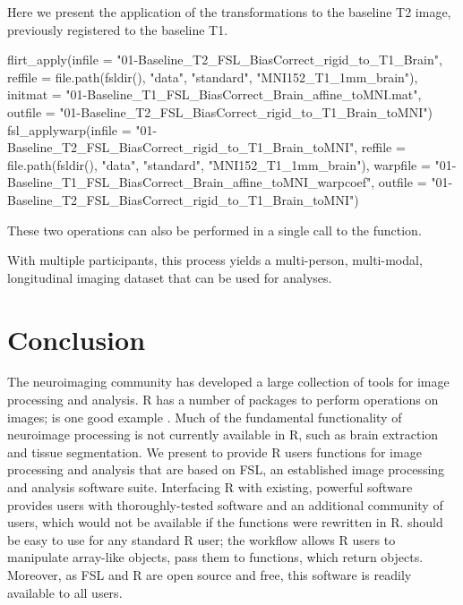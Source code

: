 Here we present the application of the transformations to the baseline T2 image, previously registered to the baseline T1.  

\begin{Schunk}
\begin{Sinput}
flirt_apply(infile = "01-Baseline_T2_FSL_BiasCorrect_rigid_to_T1_Brain",
            reffile = file.path(fsldir(), "data", "standard", "MNI152_T1_1mm_brain"),
            initmat = "01-Baseline_T1_FSL_BiasCorrect_Brain_affine_toMNI.mat",
            outfile = "01-Baseline_T2_FSL_BiasCorrect_rigid_to_T1_Brain_toMNI")
fsl_applywarp(infile = "01-Baseline_T2_FSL_BiasCorrect_rigid_to_T1_Brain_toMNI",
              reffile = file.path(fsldir(), "data", "standard", "MNI152_T1_1mm_brain"),          
              warpfile = "01-Baseline_T1_FSL_BiasCorrect_Brain_affine_toMNI_warpcoef",
              outfile = "01-Baseline_T2_FSL_BiasCorrect_rigid_to_T1_Brain_toMNI")
\end{Sinput}
\end{Schunk}

These two operations can also be performed in a single call to the   function.  

With multiple participants, this process yields a multi-person, multi-modal, longitudinal imaging dataset that can be used for analyses.





\section{Conclusion}
The neuroimaging community has developed a large collection of tools for image processing and analysis.  R has a number of packages to perform operations on images;  is one good example \citep{EBImage}. Much of the fundamental functionality of neuroimage processing is not currently available in R, such as brain extraction and tissue segmentation.  We present  to provide R users functions for image processing and analysis that are based on FSL, an established image processing and analysis software suite.  Interfacing R with existing, powerful software provides users with thoroughly-tested software and an additional community of users, which would not be available if the functions were rewritten in R.   should be easy to use for any standard R user; the workflow allows R users to manipulate array-like  objects, pass them to  functions, which return  objects.  Moreover, as FSL and R are open source and free, this software is readily available to all users.  

